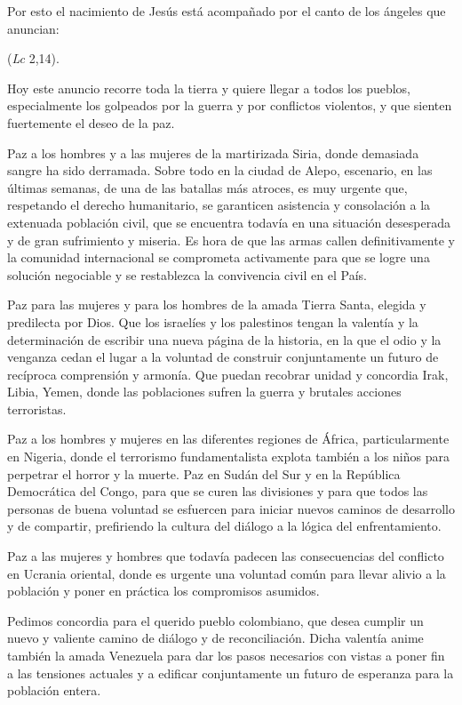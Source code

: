 \begin{body}
\begin{body}
Por esto el nacimiento de Jesús está acompañado por el canto de los ángeles que anuncian:

 (\emph{Lc} 2,14).

Hoy este anuncio recorre toda la tierra y quiere llegar a todos los pueblos, especialmente los golpeados por la guerra y por conflictos violentos, y que sienten fuertemente el deseo de la paz.

Paz a los hombres y a las mujeres de la martirizada Siria, donde demasiada sangre ha sido derramada. Sobre todo en la ciudad de Alepo, escenario, en las últimas semanas, de una de las batallas más atroces, es muy urgente que, respetando el derecho humanitario, se garanticen asistencia y consolación a la extenuada población civil, que se encuentra todavía en una situación desesperada y de gran sufrimiento y miseria. Es hora de que las armas callen definitivamente y la comunidad internacional se comprometa activamente para que se logre una solución negociable y se restablezca la convivencia civil en el País.

Paz para las mujeres y para los hombres de la amada Tierra Santa, elegida y predilecta por Dios. Que los israelíes y los palestinos tengan la valentía y la determinación de escribir una nueva página de la historia, en la que el odio y la venganza cedan el lugar a la voluntad de construir conjuntamente un futuro de recíproca comprensión y armonía. Que puedan recobrar unidad y concordia Irak, Libia, Yemen, donde las poblaciones sufren la guerra y brutales acciones terroristas.

Paz a los hombres y mujeres en las diferentes regiones de África, particularmente en Nigeria, donde el terrorismo fundamentalista explota también a los niños para perpetrar el horror y la muerte. Paz en Sudán del Sur y en la República Democrática del Congo, para que se curen las divisiones y para que todos las personas de buena voluntad se esfuercen para iniciar nuevos caminos de desarrollo y de compartir, prefiriendo la cultura del diálogo a la lógica del enfrentamiento.

Paz a las mujeres y hombres que todavía padecen las consecuencias del conflicto en Ucrania oriental, donde es urgente una voluntad común para llevar alivio a la población y poner en práctica los compromisos asumidos.

Pedimos concordia para el querido pueblo colombiano, que desea cumplir un nuevo y valiente camino de diálogo y de reconciliación. Dicha valentía anime también la amada Venezuela para dar los pasos necesarios con vistas a poner fin a las tensiones actuales y a edificar conjuntamente un futuro de esperanza para la población entera.


\end{body}
\end{body}
